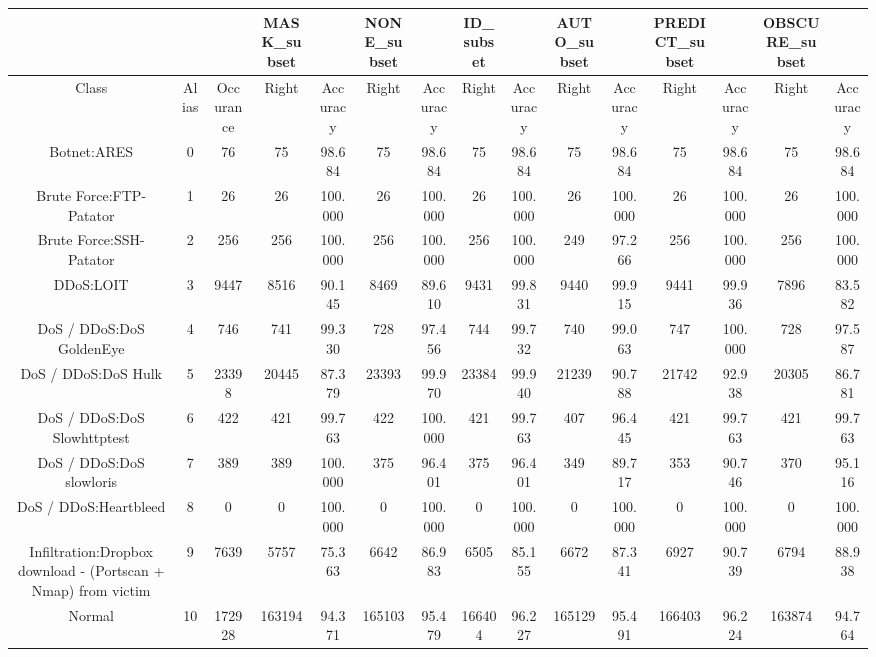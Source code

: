 \begin{table}[htb]
    \centering
    \begin{tabular}{@{}ccccccccccccccc@{}}
        \toprule
         &  &  & MASK\_subset &  & NONE\_subset &  & ID\_subset &  & AUTO\_subset &  & PREDICT\_subset &  & OBSCURE\_subset &  \\
        \midrule
        Class &  Alias &  Occurance &  Right &  Accuracy &  Right &  Accuracy &  Right &  Accuracy &  Right &  Accuracy &  Right &  Accuracy &  Right &  Accuracy \\
        Botnet:ARES &  0 &  76 &  75 &  98.684 &  75 &  98.684 &  75 &  98.684 &  75 &  98.684 &  75 &  98.684 &  75 &  98.684 \\
        Brute Force:FTP-Patator &  1 &  26 &  26 &  100.000 &  26 &  100.000 &  26 &  100.000 &  26 &  100.000 &  26 &  100.000 &  26 &  100.000 \\
        Brute Force:SSH-Patator &  2 &  256 &  256 &  100.000 &  256 &  100.000 &  256 &  100.000 &  249 &  97.266 &  256 &  100.000 &  256 &  100.000 \\
        DDoS:LOIT &  3 &  9447 &  8516 &  90.145 &  8469 &  89.610 &  9431 &  99.831 &  9440 &  99.915 &  9441 &  99.936 &  7896 &  83.582 \\
        DoS / DDoS:DoS GoldenEye &  4 &  746 &  741 &  99.330 &  728 &  97.456 &  744 &  99.732 &  740 &  99.063 &  747 &  100.000 &  728 &  97.587 \\
        DoS / DDoS:DoS Hulk &  5 &  23398 &  20445 &  87.379 &  23393 &  99.970 &  23384 &  99.940 &  21239 &  90.788 &  21742 &  92.938 &  20305 &  86.781 \\
        DoS / DDoS:DoS Slowhttptest &  6 &  422 &  421 &  99.763 &  422 &  100.000 &  421 &  99.763 &  407 &  96.445 &  421 &  99.763 &  421 &  99.763 \\
        DoS / DDoS:DoS slowloris &  7 &  389 &  389 &  100.000 &  375 &  96.401 &  375 &  96.401 &  349 &  89.717 &  353 &  90.746 &  370 &  95.116 \\
        DoS / DDoS:Heartbleed &  8 &  0 &  0 &  100.000 &  0 &  100.000 &  0 &  100.000 &  0 &  100.000 &  0 &  100.000 &  0 &  100.000 \\
        Infiltration:Dropbox download - (Portscan + Nmap) from victim &  9 &  7639 &  5757 &  75.363 &  6642 &  86.983 &  6505 &  85.155 &  6672 &  87.341 &  6927 &  90.739 &  6794 &  88.938 \\
        Normal &  10 &  172928 &  163194 &  94.371 &  165103 &  95.479 &  166404 &  96.227 &  165129 &  95.491 &  166403 &  96.224 &  163874 &  94.764 \\

\end{tabular}
\end{table}
